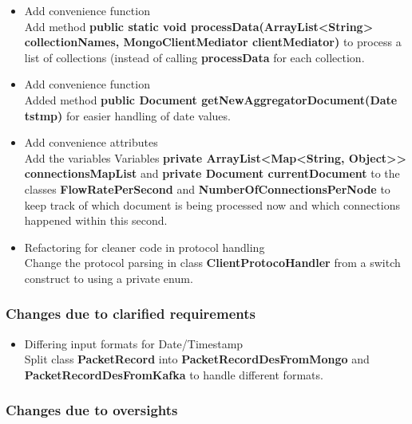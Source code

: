 \documentclass[oneside, english, final]{design}
\begin{document}
\begin{itemize}
      \item{Add convenience function}
            \\
            Add method \textsf{\textbf{public static void processData(ArrayList<String> collectionNames, MongoClientMediator clientMediator)}} to process a list of collections (instead of calling \textsf{\textbf{processData}} for each collection.

      \item{Add convenience function}
            \\
            Added method \textsf{\textbf{public Document getNewAggregatorDocument(Date tstmp)}} for easier handling of date values.


      \item{Add convenience attributes}
            \\
            Add the variables Variables
            \textsf{\textbf{private ArrayList<Map<String, Object>> connectionsMapList}} and
            \textsf{\textbf{private Document currentDocument}} to the classes \textsf{\textbf{FlowRatePerSecond}} and \textsf{\textbf{NumberOfConnectionsPerNode}} to
            keep track of which document is being processed now and which connections happened within this second.


      \item{Refactoring for cleaner code in protocol handling}
            \\
            Change the protocol parsing in class \textsf{\textbf{ClientProtocoHandler}} from a switch construct to using a private enum.

\end{itemize}

\subsubsection{Changes due to clarified requirements}
\begin{itemize}
      \item{Differing input formats for Date/Timestamp}
            \\
            Split class \textsf{\textbf{PacketRecord}} into \textsf{\textbf{PacketRecordDesFromMongo}} and \textsf{\textbf{PacketRecordDesFromKafka}} to handle different formats.

\end{itemize}


\subsubsection{Changes due to oversights}
\end{document}

